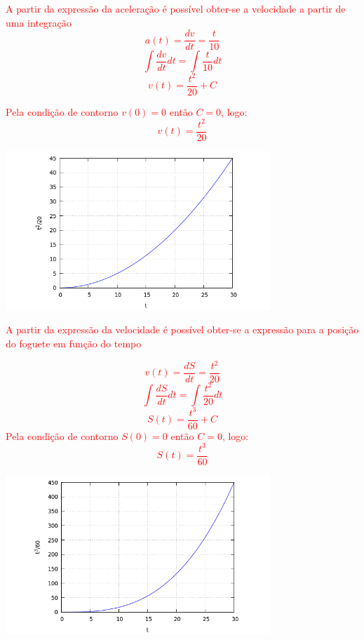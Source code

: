 \documentclass[
    12pt, %
    openright,
    twoside, %
    a4paper, %
    article,
    english,brazil %
]{abntex2}
\begin{document}
\textcolor{red}{A partir da expressão da aceleração é possível obter-se a velocidade a partir de uma integração}
\textcolor{red}{
    $$a(t) = \frac{dv}{dt} = \frac{t}{10}$$
    $$\int \frac{dv}{dt} dt = \int \frac{t}{10} dt $$
    $$v(t) = \frac{t^2}{20} + C $$
}

\textcolor{red}{Pela condição de contorno $v(0) = 0$ então $C = 0$, logo:}
\textcolor{red}{
    $$v(t) = \frac{t^2}{20} $$
}

\includegraphics[width=\linewidth,height=6cm,keepaspectratio,]{./fig/exerc01-01.png}

\textcolor{red}{A partir da expressão da velocidade é possível obter-se a expressão para a posição do foguete em função do tempo}

\textcolor{red}{
    $$v(t) = \frac{dS}{dt} = \frac{t^2}{20} $$
    $$\int \frac{dS}{dt} dt = \int \frac{t^2}{20} dt$$
    $$S(t) = \frac{t^3}{60} + C $$
}
\textcolor{red}{Pela condição de contorno $S(0) = 0$ então $C = 0$, logo:}
\textcolor{red}{
    $$S(t) = \frac{t^3}{60} $$
}

\includegraphics[width=\linewidth,height=6cm,keepaspectratio,]{./fig/exerc01-02.png}
\end{document}
